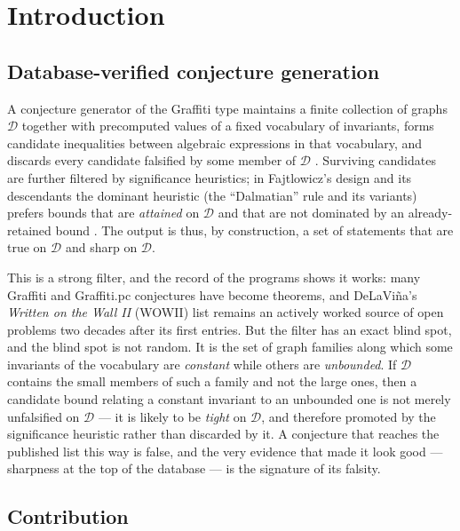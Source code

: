 \documentclass[10pt,a4paper]{article}
\theoremstyle{plain}
\theoremstyle{definition}
\begin{document}
\section{Introduction}

\subsection{Database-verified conjecture generation}

A conjecture generator of the Graffiti type maintains a finite collection of graphs
$\mathcal{D}$ together with precomputed values of a fixed vocabulary of invariants, forms
candidate inequalities between algebraic expressions in that vocabulary, and discards every
candidate falsified by some member of $\mathcal{D}$
\cite{fajtlowicz1988,delavina2005gpc,delavina2005history,larson2005survey,larsonvancleemput2016,davila2026txgraffiti}.
Surviving candidates are further filtered by significance heuristics; in Fajtlowicz's design and
its descendants the dominant heuristic (the ``Dalmatian'' rule and its variants) prefers bounds
that are \emph{attained} on $\mathcal{D}$ and that are not dominated by an already-retained bound
\cite{larsonvancleemput2016}. The output is thus, by construction, a set of statements that are
true on $\mathcal{D}$ and sharp on $\mathcal{D}$.

This is a strong filter, and the record of the programs shows it works: many Graffiti and
Graffiti.pc conjectures have become theorems, and DeLaVi\~na's \emph{Written on the Wall II}
(WOWII) list \cite{wowii} remains an actively worked source of open problems two decades after
its first entries. But the filter has an exact blind spot, and the blind spot is not random.
It is the set of graph families along which some invariants of the vocabulary are
\emph{constant} while others are \emph{unbounded}. If $\mathcal{D}$ contains the small members
of such a family and not the large ones, then a candidate bound relating a constant invariant to
an unbounded one is not merely unfalsified on $\mathcal{D}$ --- it is likely to be \emph{tight}
on $\mathcal{D}$, and therefore promoted by the significance heuristic rather than discarded by
it. A conjecture that reaches the published list this way is false, and the very evidence that
made it look good --- sharpness at the top of the database --- is the signature of its
falsity.

\subsection{Contribution}
\end{document}
